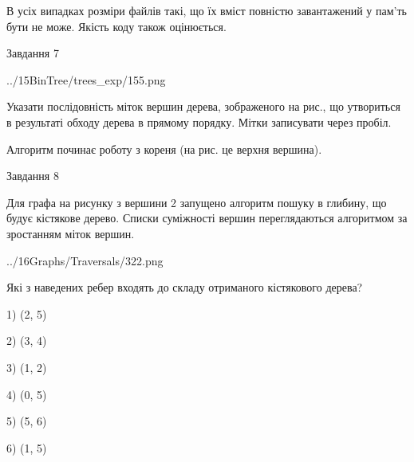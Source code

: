 \documentclass[12pt, ukrainian]{article}
\begin{document}
{В усіх випадках розміри файлів такі, що їх вміст повністю завантажений у пам'ть бути не може. Якість коду також оцінюється.



\vspace{10mm}\par

\newpage
\begin{minipage}[t]{9.7cm}
               
{\begin{center}Завдання {7}\end{center}}
\vspace{-4mm}

\begin{center}
	{../15BinTree/trees_exp/155.png}
\end{center}
Указати послідовність міток вершин дерева, зображеного на рис., що утвориться в результаті обходу дерева в прямому порядку. Мітки записувати через пробіл.\par Алгоритм починає роботу з кореня (на рис. це верхня вершина).\par

\end{minipage}
\vline \hspace{8mm}
\begin{minipage}[t]{8.0cm}
               
{\begin{center}Завдання {8}\end{center}}
\vspace{-4mm}
Для графа на рисунку з вершини 2 запущено алгоритм пошуку в глибину, що будує кістякове дерево. Списки суміжності вершин переглядаються алгоритмом за зростанням міток вершин.\par
\begin{center}
	{../16Graphs/Traversals/322.png}
\end{center}
\par Які з наведених ребер входять до складу отриманого кістякового дерева?\par
1) (2, 5)\par
2) (3, 4)\par
3) (1, 2)\par
4) (0, 5)\par
5) (5, 6)\par
6) (1, 5)\par
{\vskip 15pt} \par


\end{minipage}}
\end{document}
